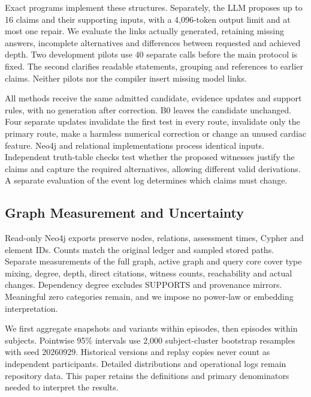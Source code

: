 \documentclass[runningheads]{llncs}
\begin{document}
Exact programs implement these structures. Separately, the LLM proposes up
to 16 claims and their supporting inputs, with a 4,096-token output limit
and at most one repair. We evaluate the links actually generated, retaining
missing answers, incomplete alternatives and differences between requested
and achieved depth. Two development pilots use 40 separate calls before the
main protocol is fixed. The second clarifies readable statements, grouping
and references to earlier claims. Neither pilots nor the compiler insert
missing model links.

All methods receive the same admitted candidate, evidence updates and support
rules, with no generation after correction. B0 leaves the candidate unchanged.
Four separate updates invalidate the first test in every route, invalidate
only the primary route, make a harmless numerical correction or change an
unused cardiac feature. Neo4j and relational implementations process identical
inputs. Independent truth-table checks test whether the proposed witnesses
justify the claims and capture the required alternatives, allowing different
valid derivations. A separate evaluation of the event log determines which
claims must change.




\subsection{Graph Measurement and Uncertainty}

Read-only Neo4j exports preserve nodes, relations, assessment times, Cypher and
element IDs. Counts match the original ledger and sampled stored paths.
Separate measurements of the full graph, active graph and query core cover type mixing, degree, depth, direct citations, witness counts, reachability
and actual changes. Dependency degree excludes SUPPORTS and provenance mirrors.
Meaningful zero categories remain, and we impose no power-law or embedding
interpretation.

We first aggregate snapshots and variants within episodes, then episodes within
subjects. Pointwise 95\% intervals use 2,000 subject-cluster bootstrap resamples
with seed 20260929. Historical versions and replay copies never count as
independent participants. Detailed distributions and operational logs remain
repository data. This paper retains the definitions and primary denominators
needed to interpret the results.




\end{document}
